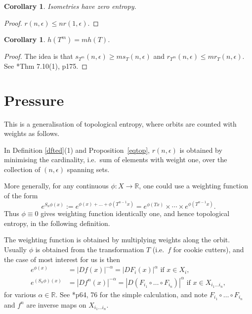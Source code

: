 \documentclass[a4paper]{amsart}
\theoremstyle{plain}
\newtheorem{corollary}[theorem]{Corollary}
\theoremstyle{definition}
\theoremstyle{remark}
\begin{document}
\begin{corollary} Isometries have zero entropy.
\end{corollary}

\begin{proof} $ r(n,\epsilon ) \leq n r(1,\epsilon ) $. 
\end{proof}


\begin{corollary} $ h(T^m) = mh(T) $. 
\end{corollary}

\begin{proof}
The idea is that $ s_{T^m}(n,\epsilon ) \geq m s_T(n,\epsilon) $ and  
$ r_{T^m}(n,\epsilon ) \leq m r_T(n,\epsilon) $.  See \cite{Wal}*{Thm 7.10(1), p175}.
\end{proof} 


\section{\textbf{Pressure}}\label{secpr}

This is a generalisation of topological entropy, where orbits are counted with weights as follows.  

\medskip In Definition \ref{dfted}(1) and Proposition~\ref{eqtop}, $ r(n,\epsilon) $  is obtained   by minimising the cardinality, i.e.\  sum of elements with weight one, over the collection of  $ (n,\epsilon ) $ spanning sets.  

More generally, for any continuous $ \phi:X \to \mathbb{R} $, one could use a  weighting function of the form
\[
e^{S_n\phi(x)} := e^{\phi(x)+ \dots + \phi(T^{n-1}x)} = e^{\phi(Tx )}\times  \cdots \times  e^{  \phi(T^{n-1}x)} .
\]
Thus $ \phi \equiv 0 $ gives weighting function identically one, and hence topological entropy, in the following definition.  

The weighting function is obtained by multiplying weights along the orbit. Usually $ \phi $ is obtained from the transformation $ T $ (i.e.\  $ f $ for cookie cutters), and the case of most interest for us is   then
\begin{align*} 
e^{\phi(x) } &=  |Df(x)|^ {-\alpha}   = \left|DF_i(x)\right|^ \alpha \text{ if } x \in X_i, \\
e^{(S_n\phi)(x)} &= |Df^n(x)|^{- \alpha }  =   \left| D(F_{i_1}\circ \dots \circ  F_{i_n})\right|^{\alpha} 
                                                                \text{ if } x \in X_{i_1\dots i_n},
\end{align*} 
for various $ \alpha \in \mathbb{R} $.  See \cite{Fal}*{p64, 76} for the simple calculation, and note 
$ F_{i_1}\circ \dots \circ  F_{i_n} $ and $ f ^n$ are inverse maps on $  X_{i_1\dots i_n} $.
 
\end{document}

